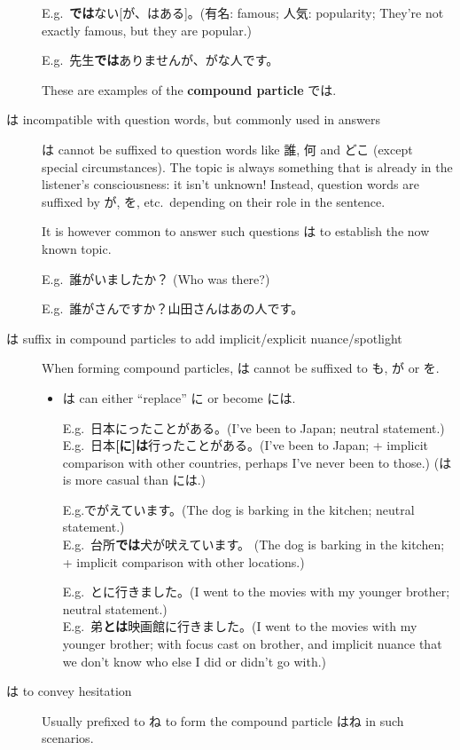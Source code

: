\documentclass[../nihongo-gakushuu-kyouzai.tex]{subfiles}
\begin{document}
\begin{description}
    E.g.\ \textbf{では}ない[が、はある]。(有名: famous; 人気: popularity; They're not exactly famous, but they are popular.)

    E.g.\ 先生\textbf{では}ありませんが、がな人です。


    These are examples of the \textbf{compound particle} では.
    \item[は incompatible with question words, but commonly used in answers] は cannot be suffixed to question words like 誰, 何 and どこ (except special circumstances). The topic is always something that is already in the listener's consciousness: it isn't unknown! Instead, question words are suffixed by が, を, etc.\ depending on their role in the sentence.

    It is however common to answer such questions は to establish the now known topic.

    E.g.\ 誰がいましたか？ (Who was there?)

    E.g.\ 誰がさんですか？山田さんはあの人です。
    \item[は suffix in compound particles to add implicit/explicit nuance/spotlight] When forming compound particles, は cannot be suffixed to も, が or を.
    \begin{itemize}
        \item は can either ``replace'' に or become には.

        E.g.\ 日本にったことがある。(I've been to Japan; neutral statement.)\\
        E.g.\ 日本\textbf{[に]は}行ったことがある。(I've been to Japan; + implicit comparison with other countries, perhaps I've never been to those.) (は is more casual than には.)

        E.g.でがえています。(The dog is barking in the kitchen; neutral statement.)\\
        E.g.\ 台所\textbf{では}犬が吠えています。 (The dog is barking in the kitchen; + implicit comparison with other locations.)

        E.g.\ とに行きました。(I went to the movies with my younger brother; neutral statement.)\\
        E.g.\ 弟\textbf{とは}映画館に行きました。(I went to the movies with my younger brother; with focus cast on brother, and implicit nuance that we don't know who else I did or didn't go with.)
    \end{itemize}
    \item[は to convey hesitation] Usually prefixed to ね to form the compound particle はね in such scenarios.


\end{description}
\end{document}
